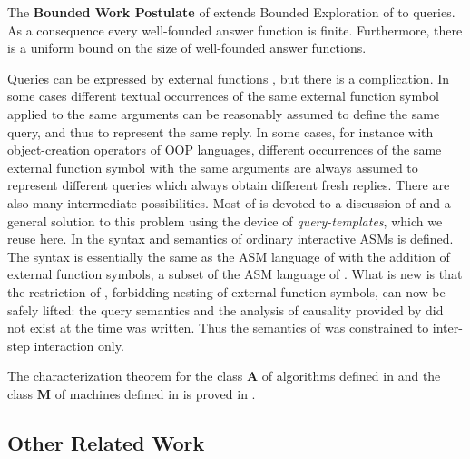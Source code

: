 \documentclass{LMCS}
\theoremstyle{definition}
\newcommand{\bld}[1]{\ensuremath{\mathbf {#1}}}
\begin{document}
The \textbf{Bounded Work Postulate} of \cite{oa1} extends Bounded
Exploration of \cite{seqth} to queries.  As a consequence every
well-founded answer function is finite.  Furthermore, there is a
uniform bound on the size of well-founded answer functions.

Queries can be expressed by external functions \cite{lipari}, but there is
a complication.  In some cases different textual occurrences of the same
external function symbol applied to the same arguments can be reasonably
assumed to define the same query, and thus to represent the same reply. In
some cases, for instance with object-creation operators of OOP languages,
different occurrences of the same external function symbol with the same
arguments are always assumed to represent different queries which always
obtain different fresh replies. There are also many intermediate
possibilities. Most of \cite{oa2} is devoted to a discussion of and a
general solution to this problem using the device of
\emph{query-templates}, which we reuse here. In \cite{oa2} the syntax and
semantics of ordinary interactive ASMs is defined. The syntax is
essentially the same as the ASM language of \cite{seqth} with the addition
of external function symbols, a subset of the ASM language of
\cite{lipari}. What is new is that the restriction of \cite{lipari},
forbidding nesting of external function symbols, can now be safely lifted:
the query semantics and the analysis of causality provided by \cite{oa1}
did not exist at the time \cite{lipari} was written. Thus the semantics of
\cite{lipari} was constrained to inter-step interaction only.

The characterization theorem for the class \bld{A} of algorithms
defined in \cite{oa1} and the class \bld{M} of machines defined in
\cite{oa2} is proved in \cite{oa3}.

\subsection{Other Related Work}
\label{sec:other}
\end{document}
